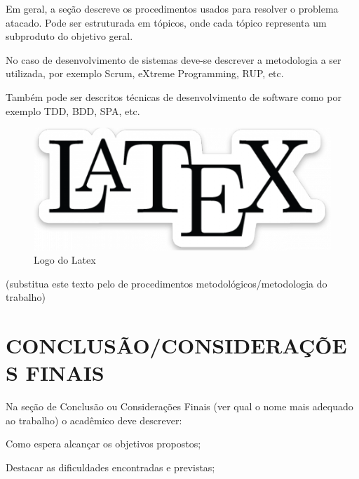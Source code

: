 Em geral, a seção descreve os procedimentos usados para resolver o problema atacado. Pode ser estruturada em tópicos, onde cada tópico representa um subproduto do objetivo geral.

No caso de desenvolvimento de sistemas deve-se descrever a metodologia a ser utilizada, por exemplo Scrum, eXtreme Programming, RUP, etc.

Também pode ser descritos técnicas de desenvolvimento de software como por exemplo TDD, BDD, SPA,  etc.

\begin{figure}[!htb]
  \captionsetup{singlelinecheck=false}
  \centering
  \begin{measuredfigure}
    \includegraphics[scale=0.5,keepaspectratio]{dados/images/latex-logo.png}
    \caption{Logo do Latex}
  \end{measuredfigure}
  \label{fig:latex_logo}
\end{figure}

(substitua este texto pelo de procedimentos metodológicos/metodologia do trabalho)


\section{CONCLUSÃO/CONSIDERAÇÕES FINAIS} %
\label{sec:conclusao}
Na seção de Conclusão ou Considerações Finais (ver qual o nome mais adequado ao trabalho) o acadêmico deve descrever:

Como espera alcançar os objetivos propostos;

Destacar as dificuldades encontradas e previstas;

